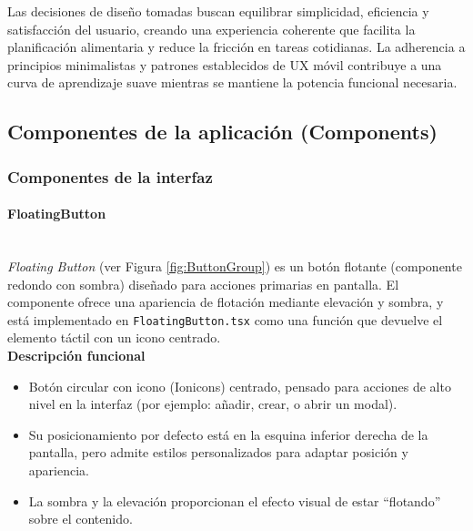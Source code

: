 \documentclass[twoside, openright, 11pt]{report}
\begin{document}
				
					
					Las decisiones de diseño tomadas buscan equilibrar simplicidad, eficiencia y satisfacción del usuario, creando una experiencia coherente que facilita la planificación alimentaria y reduce la fricción en tareas cotidianas. La adherencia a principios minimalistas y patrones establecidos de UX móvil contribuye a una curva de aprendizaje suave mientras se mantiene la potencia funcional necesaria.
			
		\subsection{Componentes de la aplicación (Components)}
			\subsubsection{Componentes de la interfaz}
					\paragraph{FloatingButton\\\\}
						\label{FloatingButton}
						
						\textit{Floating Button} (ver Figura \ref{fig:ButtonGroup}) es un botón flotante (componente redondo con sombra) diseñado para acciones primarias en pantalla. El componente ofrece una apariencia de flotación mediante elevación y sombra, y está implementado en \texttt{FloatingButton.tsx} como una función que devuelve el elemento táctil con un icono centrado.\\
						
						\textbf{Descripción funcional\\}
						\begin{itemize}
							\item Botón circular con icono (Ionicons) centrado, pensado para acciones de alto nivel en la interfaz (por ejemplo: añadir, crear, o abrir un modal).
							\item Su posicionamiento por defecto está en la esquina inferior derecha de la pantalla, pero admite estilos personalizados para adaptar posición y apariencia.
							\item La sombra y la elevación proporcionan el efecto visual de estar “flotando” sobre el contenido.
						\end{itemize}
						
\end{document}
